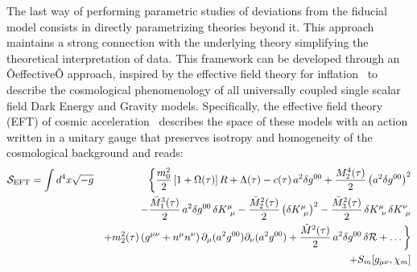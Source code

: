 %
The last way of performing parametric studies of deviations from the fiducial model consists in directly parametrizing theories beyond it. This approach maintains a strong connection with the underlying theory simplifying the theoretical interpretation of data. This framework can be developed through an ÔeffectiveÕ approach, inspired by the effective field theory for inflation~\cite{Creminelli:2006xe,Cheung:2007st,Weinberg:2008hq,Creminelli:2008wc,Park:2010cw,Jimenez:2011nn} to describe the cosmological phenomenology of all universally coupled single scalar field Dark Energy and Gravity models. Specifically, the effective field theory (EFT) of cosmic acceleration~\cite{Gubitosi:2012hu,Bloomfield:2012ff} describes the space of these models with an action written in a unitary gauge that preserves isotropy and homogeneity of the cosmological background and reads:
%
\begin{eqnarray} \label{Eq:EFTaction}
\mathcal{S}_{\rm EFT} = \int d^4x \sqrt{-g}&& \bigg\{ \frac{m_0^2}{2} \left[1+\Omega(\tau)\right] R + \Lambda(\tau) - c(\tau)\,a^2\delta g^{00} + \frac{M_2^4 (\tau)}{2} \left( a^2\delta g^{00} \right)^2 \nonumber \\ 
&&   - \frac{\bar{M}_1^3 (\tau)}{2} \, a^2\delta g^{00}\,\delta K{^\mu_{\,\,\mu}}  - \frac{\bar{M}_2^2 (\tau)}{2} \left( \delta {K}{^\mu_{\,\,\mu}}\right)^2   - \frac{\bar{M}_3^2 (\tau)}{2} \,\delta {K}{^\mu_{\,\,\nu}}\,\delta {K}{^\nu_{\,\,\mu}} \nonumber \\
&& + m_2^2(\tau)\left(g^{\mu\nu}+n^{\mu} n^{\nu}\right)\partial_{\mu}(a^2g^{00})\partial_{\nu}(a^2g^{00}) +\frac{\hat{M}^2(\tau)}{2} \, a^2 \delta g^{00}\,\delta \mathcal{R}+	\ldots \bigg\}  \nonumber \\
&& + S_{m} [g_{\mu \nu}, \chi_m ]
\end{eqnarray}
%
